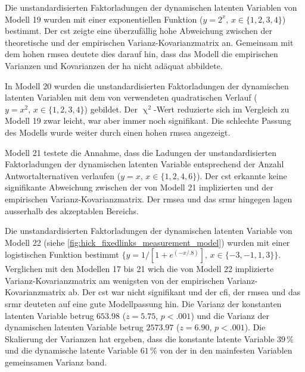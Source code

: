 \documentclass[11pt, twoside, a4paper]{book}		%
\begin{document}
Die unstandardisierten Faktorladungen der dynamischen latenten Variablen von Modell 19 wurden mit einer exponentiellen Funktion ($y=2^x,\,x\in\{1, 2, 3, 4\}$) bestimmt. Der \gls{cst} zeigte eine überzufällig hohe Abweichung zwischen der theoretische und der empirischen Var\-ianz-Ko\-var\-ianz\-ma\-trix an. Gemeinsam mit dem hohen \gls{rmsea} deutete dies darauf hin, dass das Modell die empirischen Varianzen und Kovarianzen der \gls{ha} nicht adäquat abbildete.

In Modell 20 wurden die unstandardisierten Faktorladungen der dynamischen latenten Variablen mit dem von \citet{Schweizer2006a} verwendeten quadratischen Verlauf ($y=x^2,\,x\in\{1, 2, 3, 4\}$) gebildet. Der $\upchi^2$-Wert reduzierte sich im Vergleich zu Modell 19 zwar leicht, war aber immer noch signifikant. Die schlechte Passung des Modells wurde weiter durch einen hohen \gls{rmsea} angezeigt.

Modell 21 testete die Annahme, dass die Ladungen der unstandardisierten Faktorladungen der dynamischen latenten Variable entsprechend der Anzahl Antwortalternativen verlaufen ($y=x,\,x\in\{1, 2, 4, 6\}$). Der \gls{cst} erkannte keine signifikante Abweichung zwischen der von Modell 21 implizierten und der empirischen Var\-ianz-Ko\-var\-ianz\-ma\-trix. Der \gls{rmsea} und das \gls{srmr} hingegen lagen ausserhalb des akzeptablen Bereichs.

Die unstandardisierten Faktorladungen der dynamischen latenten Variable von Modell 22 (siehe \autoref{fig:hick_fixedlinks_measurement_model}) wurden mit einer logistischen Funktion bestimmt $\{y={1}/[{1 + e^{(-x/.8)}}],\,x\in\{-3,-1,1,3\}\}$. Verglichen mit den Modellen 17 bis 21 wich die von Modell 22 implizierte Var\-ianz-Ko\-var\-ianz\-ma\-trix am wenigsten von der empirischen Var\-ianz-Ko\-var\-ianz\-ma\-trix ab. Der \gls{cst} war nicht signifikant und der \gls{cfi}, der \gls{rmsea} und das \gls{srmr} deuteten auf eine gute Modellpassung hin. 
Die Varianz der konstanten latenten Variable betrug $653.98$ ($z=5.75$, $p<.001$) und die Varianz der dynamischen latenten Variable betrug $2573.97$ ($z=6.90$, $p<.001$). Die Skalierung der Varianzen \citep{Schweizer2011a} hat ergeben, dass die konstante latente Variable $39\,\%$ und die dynamische latente Variable $61\,\%$ von der in den mainfesten Variablen gemeinsamen Varianz band.
\end{document}
